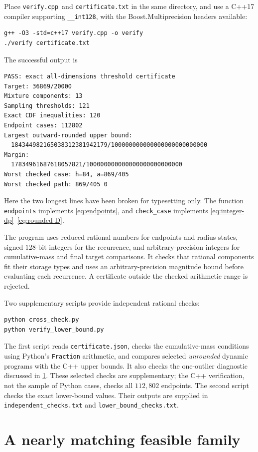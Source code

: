 \documentclass[11pt]{article}
\theoremstyle{definition}
\theoremstyle{remark}
\newcommand{\certfile}{\texttt{certificate.json}}
\newcommand{\verifier}{\nolinkurl{verify.cpp}}
\begin{document}
Place \verifier\ and \texttt{certificate.txt} in the same directory,
and use a C++17 compiler supporting \texttt{\_\_int128}, with the
Boost.Multiprecision headers available:
\begin{verbatim}
g++ -O3 -std=c++17 verify.cpp -o verify
./verify certificate.txt
\end{verbatim}
The successful output is
\begin{verbatim}
PASS: exact all-dimensions threshold certificate
Target: 36869/20000
Mixture components: 13
Sampling thresholds: 121
Exact CDF inequalities: 120
Endpoint cases: 112802
Largest outward-rounded upper bound:
  184344982165038312381942179/100000000000000000000000000
Margin:
  17834961687618057821/100000000000000000000000000
Worst checked case: h=84, a=869/405
Worst checked path: 869/405 0
\end{verbatim}
Here the two longest lines have been broken for typesetting only.
The function \texttt{endpoints} implements \eqref{eq:endpoints}, and
\texttt{check\_case} implements \eqref{eq:integer-dp}--\eqref{eq:rounded-D}.

The program uses reduced rational numbers for endpoints and radius states,
signed $128$-bit integers for the recurrence, and arbitrary-precision
integers for cumulative-mass and final target comparisons. It checks that
rational components fit their storage types and uses an
arbitrary-precision magnitude bound before evaluating each recurrence.
A certificate outside the checked arithmetic range is rejected.

Two supplementary scripts provide independent rational checks:
\begin{verbatim}
python cross_check.py
python verify_lower_bound.py
\end{verbatim}
The first script reads \certfile, checks the cumulative-mass conditions
using Python's \texttt{Fraction} arithmetic, and compares selected
\emph{unrounded} dynamic programs with the C++ upper bounds. It also
checks the one-outlier diagnostic discussed in
\cref{app:lower}. These selected checks are supplementary; the C++
verification, not the sample of Python cases, checks all $112{,}802$
endpoints. The second script checks the exact lower-bound values.
Their outputs are supplied in \texttt{independent\_checks.txt} and
\texttt{lower\_bound\_checks.txt}.

\section{A nearly matching feasible family}\label{app:lower}
\end{document}
